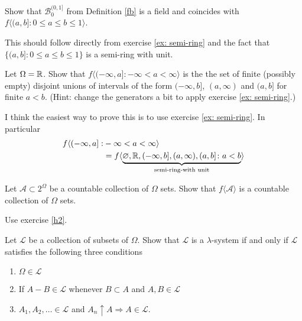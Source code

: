\begin{exercise} \label{stofB}
Show that  $\mathcal B_0^{(0,1]}$ from Definition \ref{fb} is a field and coincides with $f\langle (a,b]: 0\leq a\leq b\leq 1 \rangle $.
\end{exercise}

\begin{exerciseproof}
This should follow directly from exercise \ref{ex: semi-ring} and the fact that $\{ (a,b]: 0\leq a\leq b\leq 1 \}$ is a semi-ring with unit.
\end{exerciseproof}


\begin{exercise}
\label{ex1}
Let $\Omega = \Bbb R$.
Show that $f\langle (-\infty,a]: -\infty< a< \infty\rangle$  is the the set of finite (possibly empty) disjoint unions of intervals of the form $(-\infty, b]$, $(a,\infty)$ and $(a,b]$ for finite $a < b$. (Hint:  change the generators a bit to apply exercise \ref{ex: semi-ring}.)
\end{exercise}

\begin{exerciseproof}
  I think the easiest way to prove this is to use exercise \ref{ex: semi-ring}. In particular
\begin{align*}
f\langle (-\infty,a]:& -\infty< a< \infty\rangle \\
&= f\langle \underbrace{\varnothing, \Bbb R, (-\infty, b], (a,\infty), (a,b]\colon a < b}_{\text{semi-ring-with unit}} \rangle
\end{align*}

\end{exerciseproof}


\begin{exercise} \label{countablly generated}
Let $\mathcal A\subset2^\Omega$ be a countable collection of $\Omega$ sets.
Show that  $f\langle\mathcal A\rangle$ is a  countable collection of $\Omega$ sets.
\end{exercise}

\begin{exerciseproof}
Use  exercise \ref{h2}.
\end{exerciseproof}



\begin{exercise}
Let $\mathcal L$ be a collection of subsets of $\Omega$. Show that $\mathcal L$ is a $\lambda$-system if and only if $\mathcal L$ satisfies the following three conditions
\begin{enumerate}
\item $\Omega \in \mathcal L$
\item If $A-B\in \mathcal L$ whenever $B\subset A$ and $A, B\in \mathcal L$
\item $A_1, A_2,\ldots\in\mathcal L$ and $A_n\uparrow A \Longrightarrow A\in\mathcal L$.
\end{enumerate}
\end{exercise}

